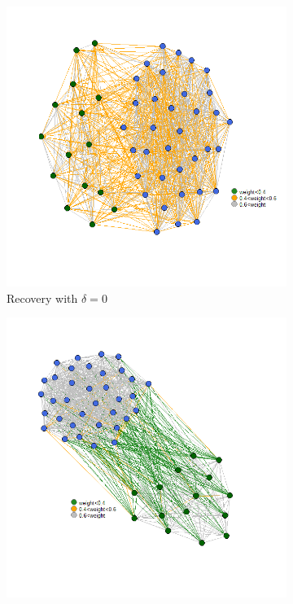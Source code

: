 \documentclass[12pt]{amsart}
\theoremstyle{remark}
\begin{document}
\begin{figure}[h]
     \centering
     \begin{subfigure}[b]{0.37\textwidth}
         \centering
         \includegraphics[width=\textwidth]{./Pictures/recupera0.png}
         \caption{Recovery with $\delta=0$}
     \end{subfigure}
     \hfill
     \begin{subfigure}[b]{0.37\textwidth}
         \centering
         \includegraphics[width=\textwidth]{./Pictures/recupera1.png}

\end{subfigure}
\end{figure}
\end{document}

